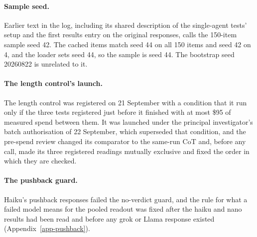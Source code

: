 \paragraph{Sample seed.}
Earlier text in the log, including its shared description of the
single-agent tests' setup and the first results entry on the original
responses, calls the 150-item sample seed 42. The cached items match
seed 44 on all 150 items and seed 42 on 4, and the loader sets seed 44, so
the sample is seed 44. The bootstrap seed 20260822 is unrelated to it.

\paragraph{The length control's launch.}
The length control was registered on 21 September with a condition that it
run only if the three tests registered just before it finished with at most
\$95 of measured spend between them. It
was launched under the principal investigator's batch authorisation of 22
September, which superseded that condition, and the pre-spend review changed its
comparator to the same-run CoT and, before any call, made its three
registered readings mutually exclusive and fixed the order in which they are
checked.

\paragraph{The pushback guard.}
Haiku's pushback responses failed the no-verdict guard, and the rule for what
a failed model means for the pooled readout was fixed after the haiku and nano
results had been read and before any grok or Llama response existed
(Appendix~\ref{app-pushback}).


